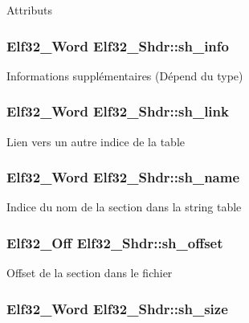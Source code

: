 Attributs \hypertarget{structElf32__Shdr_aef63fe62c2c9927f374c4f987954c6e5}{
\subsubsection[{sh\-\_\-info}]{\setlength{\rightskip}{0pt plus 5cm}Elf32\-\_\-\-Word Elf32\-\_\-\-Shdr\-::sh\-\_\-info}}\label{structElf32__Shdr_aef63fe62c2c9927f374c4f987954c6e5}
Informations supplémentaires (Dépend du type) \hypertarget{structElf32__Shdr_ad759308388eb14c5c6e4d636c38999da}{
\subsubsection[{sh\-\_\-link}]{\setlength{\rightskip}{0pt plus 5cm}Elf32\-\_\-\-Word Elf32\-\_\-\-Shdr\-::sh\-\_\-link}}\label{structElf32__Shdr_ad759308388eb14c5c6e4d636c38999da}
Lien vers un autre indice de la table \hypertarget{structElf32__Shdr_a6e8fd300ca473a31d0f65817ce371dfd}{
\subsubsection[{sh\-\_\-name}]{\setlength{\rightskip}{0pt plus 5cm}Elf32\-\_\-\-Word Elf32\-\_\-\-Shdr\-::sh\-\_\-name}}\label{structElf32__Shdr_a6e8fd300ca473a31d0f65817ce371dfd}
Indice du nom de la section dans la string table \hypertarget{structElf32__Shdr_a6e37227a5777cddc0a9dbbb3c2598ec1}{
\subsubsection[{sh\-\_\-offset}]{\setlength{\rightskip}{0pt plus 5cm}Elf32\-\_\-\-Off Elf32\-\_\-\-Shdr\-::sh\-\_\-offset}}\label{structElf32__Shdr_a6e37227a5777cddc0a9dbbb3c2598ec1}
Offset de la section dans le fichier \hypertarget{structElf32__Shdr_a84dc67bb0ab65880bbcd74fbee722ff1}{
\subsubsection[{sh\-\_\-size}]{\setlength{\rightskip}{0pt plus 5cm}Elf32\-\_\-\-Word Elf32\-\_\-\-Shdr\-::sh\-\_\-size}}\label{structElf32__Shdr_a84dc67bb0ab65880bbcd74fbee722ff1}
